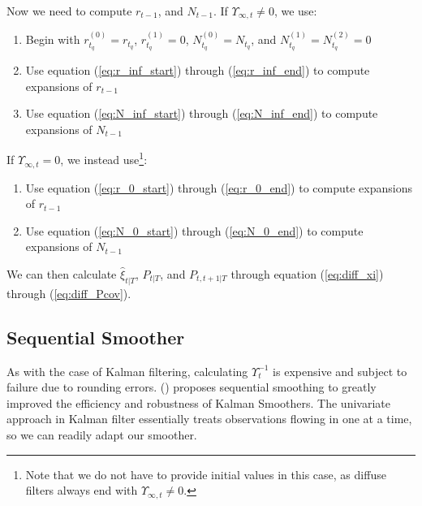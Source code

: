 \documentclass[10pt]{article}
\newenvironment{boenumerate}
    {\begin{enumerate}\renewcommand\labelenumi{\textbf\theenumi}}
    {\end{enumerate}}
\numberwithin{equation}{section}
\begin{document}
Now we need to compute $r_{t-1}$, and $N_{t-1}$. If $\Upsilon_{\infty,t}\neq 0$, we use:
\begin{boenumerate}
    \item Begin with $r_{t_q}^{(0)}=r_{t_q}$, $r_{t_q}^{(1)}=0$, $N_{t_q}^{(0)}=N_{t_q}$, and $N_{t_q}^{(1)}=N_{t_q}^{(2)}=0$
    \item Use equation (\ref{eq:r_inf_start}) through (\ref{eq:r_inf_end}) to compute expansions of $r_{t-1}$
    \item Use equation (\ref{eq:N_inf_start}) through (\ref{eq:N_inf_end}) to compute expansions of $N_{t-1}$
\end{boenumerate}

If $\Upsilon_{\infty,t}=0$, we instead use\footnote{Note that we do not have to provide initial values in this case, as diffuse filters always end with $\Upsilon_{\infty,t}\neq 0$.}:
\begin{boenumerate}
    \item Use equation (\ref{eq:r_0_start}) through (\ref{eq:r_0_end}) to compute expansions of $r_{t-1}$
    \item Use equation (\ref{eq:N_0_start}) through (\ref{eq:N_0_end}) to compute expansions of $N_{t-1}$
\end{boenumerate}

We can then calculate $\hat{\xi}_{t|T}$, $P_{t|T}$, and $P_{t,t+1|T}$ through equation (\ref{eq:diff_xi}) through (\ref{eq:diff_Pcov}). 

\subsection{Sequential Smoother}
As with the case of Kalman filtering, calculating $\Upsilon_t^{-1}$ is expensive and subject to failure due to rounding errors. (\cite{durbin_koopman_2000}) proposes sequential smoothing to greatly improved the efficiency and robustness of Kalman Smoothers. The univariate approach in Kalman filter essentially treats observations flowing in one at a time, so we can readily adapt our smoother.
\end{document}

